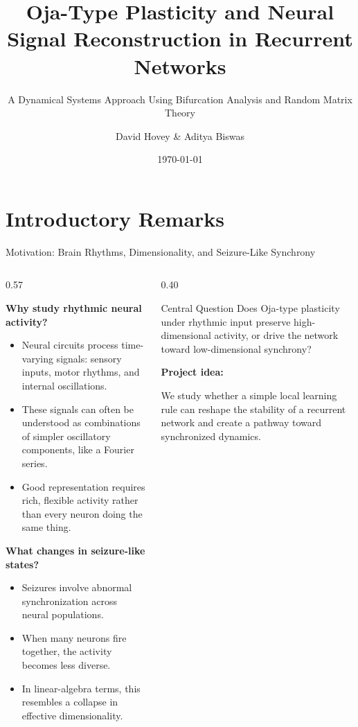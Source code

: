 \documentclass[
11pt,notheorems,hyperref={pdfauthor=whatever}
]{beamer}
\title[
Dynamical Systems Final Project
]{Oja-Type Plasticity and Neural Signal Reconstruction in Recurrent Networks}
\subtitle{A Dynamical Systems Approach Using Bifurcation Analysis and Random Matrix Theory}
\author[
Hovey \& Biswas
]{
    David Hovey \&
    Aditya Biswas
}
\institute{
    Princeton University}
\date{\today}
\begin{document}
{
\begin{frame}
  \titlepage
\end{frame}
}
\addtocounter{framenumber}{-1}


\section{Introductory Remarks}

\begin{frame}{Motivation: Brain Rhythms, Dimensionality, and Seizure-Like Synchrony}
\small

\begin{columns}[T]
\begin{column}{0.57\textwidth}

\textbf{Why study rhythmic neural activity?}
\begin{itemize}
  \item Neural circuits process time-varying signals: sensory inputs,
        motor rhythms, and internal oscillations.
  \item These signals can often be understood as combinations of simpler
        oscillatory components, like a Fourier series.
  \item Good representation requires rich, flexible activity rather than
        every neuron doing the same thing.
\end{itemize}

\vspace{0.3em}

\textbf{What changes in seizure-like states?}
\begin{itemize}
  \item Seizures involve abnormal synchronization across neural populations.
  \item When many neurons fire together, the activity becomes less diverse.
  \item In linear-algebra terms, this resembles a collapse in effective
        dimensionality.
\end{itemize}

\end{column}

\begin{column}{0.40\textwidth}

\begin{block}{Central Question}
Does Oja-type plasticity under rhythmic input preserve high-dimensional
activity, or drive the network toward low-dimensional synchrony?
\end{block}

\vspace{0.4em}

\textbf{Project idea:}

We study whether a simple local learning rule can reshape the stability of
a recurrent network and create a pathway toward synchronized dynamics.

\end{column}
\end{columns}

\end{frame}
\end{document}
